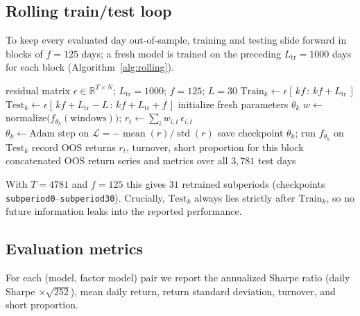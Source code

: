\documentclass[11pt]{article}
\begin{document}
\subsection{Rolling train/test loop}
To keep every evaluated day out-of-sample, training and testing slide forward in
blocks of $f=125$ days; a fresh model is trained on the preceding $L_{\text{tr}}=1000$
days for each block (Algorithm~\ref{alg:rolling}).

\begin{algorithm}[H]
\caption{Rolling out-of-sample evaluation of the policy}
\label{alg:rolling}
\begin{algorithmic}[1]
\Require residual matrix $\epsilon\in\mathbb{R}^{T\times N}$; $L_{\text{tr}}=1000$; $f=125$; $L=30$
 
  \State $\text{Train}_k \gets \epsilon[\,kf \,:\, kf+L_{\text{tr}}\,]$
  \State $\text{Test}_k  \gets \epsilon[\,kf+L_{\text{tr}}-L \,:\, kf+L_{\text{tr}}+f\,]$
  \State initialize fresh parameters $\theta_k$ 
   
      \State $w \gets$ normalize$\big(f_{\theta_k}(\text{windows})\big)$;\quad
             $r_t \gets \sum_i w_{i,t}\,\epsilon_{i,t}$
      \State $\theta_k \gets \text{Adam step on } \mathcal{L}=-\operatorname{mean}(r)/\operatorname{std}(r)$
    \EndFor
  \EndFor
  \State save checkpoint $\theta_k$; run $f_{\theta_k}$ on $\text{Test}_k$ 
  \State record OOS returns $r_t$, turnover, short proportion for this block
\EndFor
\State \Return concatenated OOS return series and metrics over all $3{,}781$ test days
\end{algorithmic}
\end{algorithm}

\noindent With $T=4781$ and $f=125$ this gives $31$ retrained subperiods
(checkpoints \texttt{subperiod0}--\texttt{subperiod30}). Crucially, $\text{Test}_k$
always lies strictly after $\text{Train}_k$, so no future information leaks into the
reported performance.

\subsection{Evaluation metrics}
For each (model, factor model) pair we report the annualized Sharpe ratio
(daily Sharpe $\times \sqrt{252}$), mean daily return, return standard deviation,
turnover, and short proportion.
\end{document}

